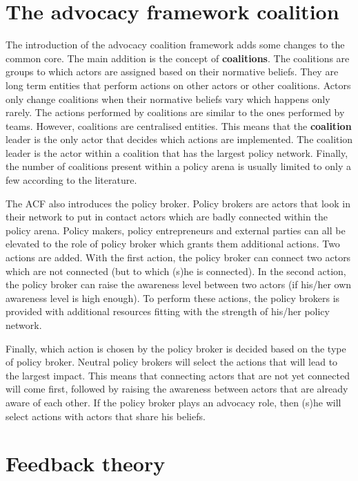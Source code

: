 \documentclass{article}
\begin{document}
\section{The advocacy framework coalition}

The introduction of the advocacy coalition framework adds some changes to the common core. The main addition is the concept of {\bfseries coalitions}. The coalitions are groups to which actors are assigned based on their normative beliefs. They are long term entities that perform actions on other actors or other coalitions. Actors only change coalitions when their normative beliefs vary which happens only rarely. The actions performed by coalitions are similar to the ones performed by teams. However, coalitions are centralised entities. This means that the {\bfseries coalition} leader is the only actor that decides which actions are implemented. The coalition leader is the actor within a coalition that has the largest policy network. Finally, the number of coalitions present within a policy arena is usually limited to only a few according to the literature. 

The ACF also introduces the policy broker. Policy brokers are actors that look in their network to put in contact actors which are badly connected within the policy arena. Policy makers, policy entrepreneurs and external parties can all be elevated to the role of policy broker which grants them additional actions. Two actions are added. With the first action, the policy broker can connect two actors which are not connected (but to which (s)he is connected). In the second action, the policy broker can raise the awareness level between two actors (if his/her own awareness level is high enough). To perform these actions, the policy brokers is provided with additional resources fitting with the strength of his/her policy network.

Finally, which action is chosen by the policy broker is decided based on the type of policy broker. Neutral policy brokers will select the actions that will lead to the largest impact. This means that connecting actors that are not yet connected will come first, followed by raising the awareness between actors that are already aware of each other. If the policy broker plays an advocacy role, then (s)he will select actions with actors that share his beliefs.

\section{Feedback theory}
\end{document}
